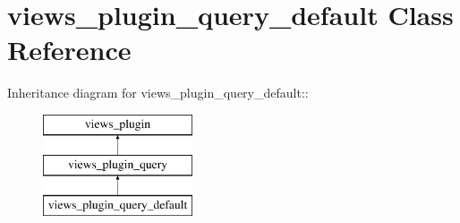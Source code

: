 \hypertarget{classviews__plugin__query__default}{
\section{views\_\-plugin\_\-query\_\-default Class Reference}
\label{classviews__plugin__query__default}
}
Inheritance diagram for views\_\-plugin\_\-query\_\-default::\begin{figure}[H]
\begin{center}
\leavevmode
\includegraphics[height=3cm]{classviews__plugin__query__default}
\end{center}
\end{figure}
